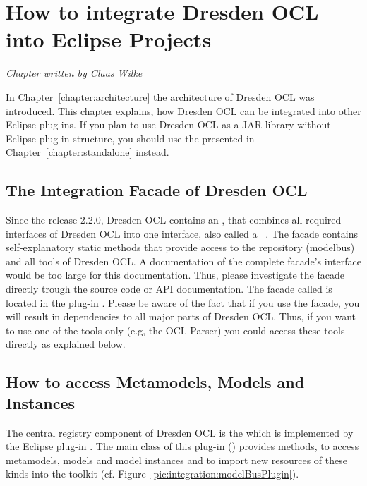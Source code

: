 \chapter{How to integrate Dresden OCL into Eclipse Projects}
\label{chapter:integration}

\begin{flushright}
\textit{Chapter written by Claas Wilke}
\end{flushright}

In Chapter~\ref{chapter:architecture} the architecture of Dresden OCL was
introduced. This chapter explains, how Dresden OCL can be integrated into
other Eclipse plug-ins. If you plan to use Dresden OCL as a \acs{JAR} library
without Eclipse plug-in structure, you should use the  presented in Chapter~\ref{chapter:standalone} instead.



\section{The Integration Facade of Dresden OCL}

Since the release 2.2.0, Dresden OCL contains an ,
that combines all required interfaces of Dresden OCL into one interface, also
called a ~\cite{gamma:dp}. The facade contains self-explanatory 
static methods that provide access to the repository (modelbus) and all tools 
of Dresden OCL. A documentation of the complete facade's interface would be too
large for this documentation. Thus, please investigate the facade directly
trough the source code or API documentation. The facade called
 is located in the plug-in
. Please be aware of the fact that if you
use the facade, you will result in dependencies to all major parts of Dresden
OCL. Thus, if you want to use one of the tools only (e.g, the \acs{OCL} Parser)
you could access these tools directly as explained below.



\section{How to access Metamodels, Models and Instances}

The central registry component of Dresden OCL is the 
which is implemented by the Eclipse plug-in 
. The main class of this plug-in 
() provides 
methods, to access metamodels, models and model instances and to import new
resources of these kinds into the toolkit (cf. 
Figure~\ref{pic:integration:modelBusPlugin}).

